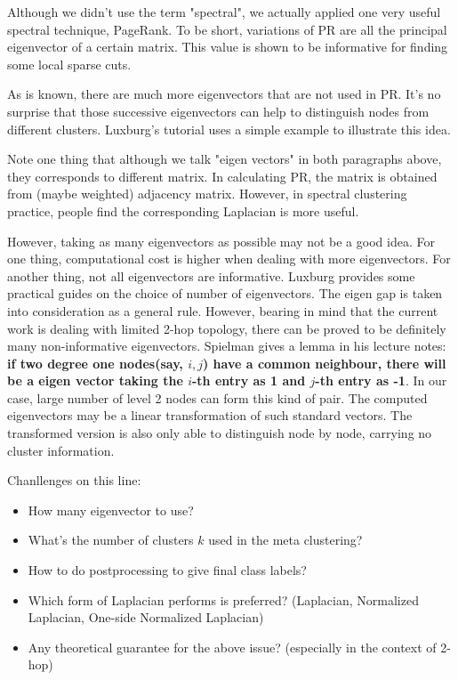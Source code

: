 \documentclass[11pt,a4paper]{article}
\begin{document}
Although we didn't use the term "spectral", we actually applied 
one very useful spectral technique, PageRank. To be short, variations 
of PR are all the principal eigenvector of a certain matrix. 
This value is shown to be informative for finding some local 
sparse cuts\cite{csci5160course}. 

As is known, there are much more eigenvectors that are not used in PR. 
It's no surprise that those successive eigenvectors can help to 
distinguish nodes from different clusters. Luxburg's tutorial\cite{von2007tutorial}
uses a simple example to illustrate this idea. 

Note one thing that although we talk "eigen vectors" in both paragraphs above, 
they corresponds to different matrix. In calculating PR, the matrix 
is obtained from (maybe weighted) adjacency matrix. However, in spectral 
clustering practice, people find the corresponding Laplacian is more useful. 

However, taking as many eigenvectors as possible may not be a good
idea. For one thing, computational cost is higher when dealing with 
more eigenvectors. For another thing, not all eigenvectors are informative. 
Luxburg\cite{von2007tutorial} provides some practical guides on the choice 
of number of eigenvectors. The eigen gap is taken into consideration as a 
general rule. However, bearing in mind that the current work is dealing 
with limited 2-hop topology, there can be proved to be definitely many 
non-informative eigenvectors. Spielman
gives a lemma in his lecture notes\cite{spielman-2009spectral-ln}:
\textbf{if two degree one nodes(say, $i,j$) have a common neighbour, there will 
be a eigen vector taking the $i$-th entry as 1 and $j$-th entry as -1}. 
In our case, large number of level 2 nodes can form this kind of pair. 
The computed eigenvectors may be a linear transformation of such 
standard vectors. The transformed version is also only able to distinguish 
node by node, carrying no cluster information. 

Chanllenges on this line:
\begin{itemize}
	\item How many eigenvector to use? 
	\item What's the number of clusters $k$ used in the 
	meta clustering? 
	\item How to do postprocessing to give final class labels? 
	\item Which form of Laplacian performs is preferred? 
	(Laplacian, Normalized Laplacian, One-side Normalized Laplacian)
	\item Any theoretical guarantee for the above issue? 
	(especially in the context of 2-hop)
\end{itemize}



\end{document}
